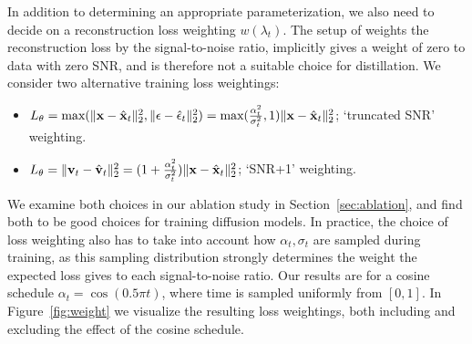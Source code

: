\documentclass[hidelinks]{article} %
\begin{document}
In addition to determining an appropriate parameterization, we also need to decide on a reconstruction loss weighting $w(\lambda_t)$. The setup of \cite{ho2020denoising} weights the reconstruction loss by the signal-to-noise ratio, implicitly gives a weight of zero to data with zero SNR, and is therefore not a suitable choice for distillation. We consider two alternative training loss weightings:
\begin{itemize}
    \item $L_{\theta} = \text{max}(\lVert {\mathbf{x}} - \hat{{\mathbf{x}}}_t \rVert_{2}^{2}, \lVert {\mathbf{\epsilon}} - \hat{{\mathbf{\epsilon}}}_t \rVert_{2}^{2}) = \text{max}(\frac{\alpha^{2}_t}{\sigma^{2}_t}, 1)\lVert {\mathbf{x}} - \hat{{\mathbf{x}}}_t \rVert_{2}^{2}$; `truncated SNR' weighting.
    \item $L_{\theta} = \lVert {\mathbf{v}}_t - \hat{{\mathbf{v}}}_t \rVert_{2}^{2} = (1+\frac{\alpha^{2}_t}{\sigma^{2}_t})\lVert {\mathbf{x}} - \hat{{\mathbf{x}}}_t \rVert_{2}^{2}$; `SNR+1' weighting.
\end{itemize}
We examine both choices in our ablation study in Section~\ref{sec:ablation}, and find both to be good choices for training diffusion models. 
In practice, the choice of loss weighting also has to take into account how $\alpha_t,\sigma_t$ are sampled during training, as this sampling distribution strongly determines the weight the expected loss gives to each signal-to-noise ratio. Our results are for a cosine schedule $\alpha_t = \cos(0.5\pi t)$, where time is sampled uniformly from $[0, 1]$. In Figure~\ref{fig:weight} we visualize the resulting loss weightings, both including and excluding the effect of the cosine schedule.
\end{document}
